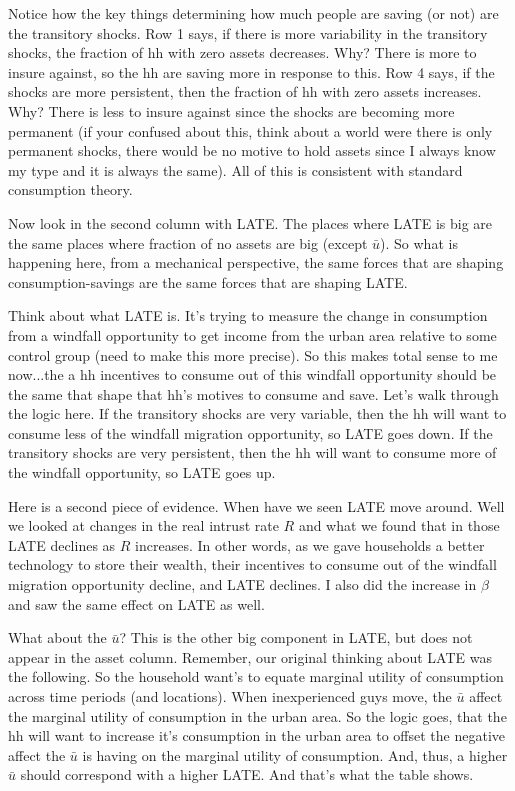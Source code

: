 \documentclass[pdftex,11pt]{article}
\begin{document}
Notice how the key things determining how much people are saving (or not) are the transitory shocks. Row 1 says, if there is more variability in the transitory shocks, the fraction of hh with zero assets decreases. Why? There is more to insure against, so the hh are saving more in response to this.  Row 4 says, if the shocks are more persistent, then the fraction of hh with zero assets increases. Why? There is less to insure against since the shocks are becoming more permanent (if your confused about this, think about a world were there is only permanent shocks, there would be no motive to hold assets since I always know my type and it is always the same). All of this is consistent with standard consumption theory. 

Now look in the second column with LATE. The places where LATE is big are the same places where fraction of no assets are big (except $\bar u$). So what is happening here, from a mechanical perspective, the same forces that are shaping consumption-savings are the same forces that are shaping LATE.

Think about what LATE is. It's trying to measure the change in consumption from a windfall opportunity to get income from the urban area relative to some control group (need to make this more precise). So this makes total sense to me now...the a hh incentives to consume out of this windfall opportunity should be the same that shape that hh's motives to consume and save. Let's walk through the logic here. If the transitory shocks are very variable, then the hh will want to consume less of the windfall migration opportunity, so LATE goes down. If the transitory shocks are very persistent, then the hh will want to consume more of the windfall opportunity, so LATE goes up.

Here is a second piece of evidence. When have we seen LATE move around. Well we looked at changes in the real intrust rate $R$ and what we found that in those LATE declines as $R$ increases. In other words, as we gave households a better technology to store their wealth, their incentives to consume out of the windfall migration opportunity decline, and LATE declines. I also did the increase in $\beta$ and saw the same effect on LATE as well. 

What about the $\bar u$? This is the other big component in LATE, but does not appear in the asset column. Remember, our original thinking about LATE was the following. So the household want's to equate marginal utility of consumption across time periods (and locations). When inexperienced guys move, the $\bar u$ affect the marginal utility of consumption in the urban area. So the logic goes, that the hh will want to increase it's consumption in the urban area to offset the negative affect the $\bar u$ is having on the marginal utility of consumption. And, thus, a higher $\bar u$ should correspond with a higher LATE. And that's what the table shows.
\end{document}
